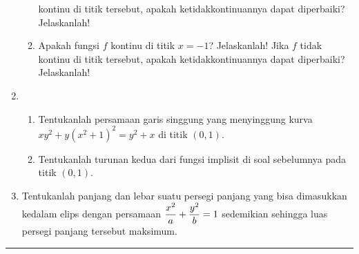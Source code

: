 \begin{enumerate}[leftmargin=*, label={\arabic*}.]
\begin{enumerate}[label={\alph*}.]
    kontinu di titik tersebut, apakah ketidakkontinuannya dapat diperbaiki? 
    Jelaskanlah! 
    \item Apakah fungsi $f$ kontinu di titik $x=-1$? Jelaskanlah! Jika $f$ tidak 
    kontinu di titik tersebut, apakah ketidakkontinuannya dapat diperbaiki? 
    Jelaskanlah! 
    \end{enumerate}
\item 
    \begin{enumerate}[label={\alph*}.]
    \item Tentukanlah persamaan garis singgung yang menyinggung kurva \\
    $xy^{2}+y(x^{2}+1)^{2} = y^{2}+x$ di titik $(0,1)$.
    \item Tentukanlah turunan kedua dari fungsi implisit di soal sebelumnya 
    pada titik $(0,1)$.
    \end{enumerate}
\item Tentukanlah panjang dan lebar suatu persegi panjang yang bisa dimasukkan 
kedalam elips dengan persamaan $\displaystyle \frac{x^{2}}{a}+\frac{y^{2}}{b}=1$ 
sedemikian sehingga luas persegi panjang tersebut maksimum.
\end{enumerate}


\vspace{0.2cm}\hrule height 1pt\vspace{0.5cm}


